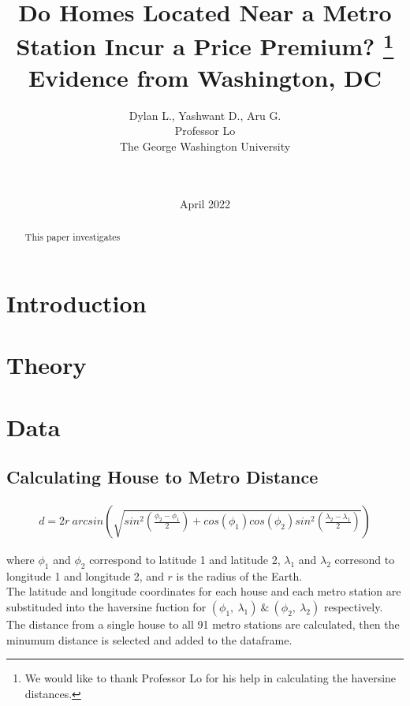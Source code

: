 \documentclass[12pt]{report}
\newcommand\tab[1][.50cm]{\hspace*{#1}}
\begin{document}
\title{%
Do Homes Located Near a Metro Station Incur a Price Premium? \thanks{{We would like to thank Professor Lo for his help in calculating the haversine distances.}} \\ 
\Large
Evidence from Washington, DC}
\author{Dylan L., Yashwant D., Aru G. \\ Professor Lo\\The George Washington University\\  \\  \\ }
\date{April 2022}

\maketitle


\bigskip
\bigskip
\bigskip
\bigskip
\bigskip
\bigskip
\bigskip
\bigskip


\begin{abstract}
\smallskip
This paper investigates 

\end{abstract}

\section*{Introduction}
\section*{Theory}
\section*{Data}






\subsection*{Calculating House to Metro Distance}

\begin{gather}
\ d=2r\ arcsin \left(\sqrt{sin^{2} \left( \frac{\phi_{2}-\phi_{1}} {2} \right) +cos(\phi_1)cos(\phi_2)sin^2 \left( \frac{\lambda_{2}-\lambda_{1}} {2} \right)       } \right) \ 
\end{gather}

where $\phi_1$ and $\phi_2$ correspond to latitude 1 and latitude 2, $\lambda_1$ and $\lambda_2$ corresond to longitude 1 and longitude 2, and $r$ is the radius of the Earth.\\
\tab The latitude and longitude coordinates for each house and each metro station are substituded into the haversine fuction for $(\phi_1,\ \lambda_1) \ \& \  (\phi_2,\ \lambda_2)$ respectively. The distance from a single house to all 91 metro stations are 
calculated, then the minumum distance is selected and added to the dataframe.
\end{document}
